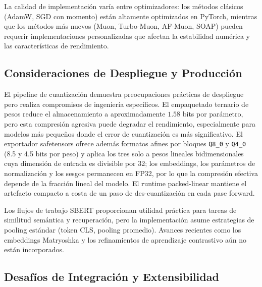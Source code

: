 La calidad de implementación varía entre optimizadores: los métodos clásicos (AdamW, SGD con momento) están altamente optimizados en PyTorch, mientras que los métodos más nuevos (Muon, Turbo-Muon, AF-Muon, SOAP) pueden requerir implementaciones personalizadas que afectan la estabilidad numérica y las características de rendimiento.

\subsection{Consideraciones de Despliegue y Producción}

El pipeline de cuantización demuestra preocupaciones prácticas de despliegue pero realiza compromisos de ingeniería específicos. El empaquetado ternario de pesos reduce el almacenamiento a aproximadamente $1.58$ bits por parámetro, pero esta compresión agresiva puede degradar el rendimiento, especialmente para modelos más pequeños donde el error de cuantización es más significativo. El exportador safetensors ofrece además formatos afines por bloques \texttt{Q8\_0} y \texttt{Q4\_0} (8.5 y 4.5 bits por peso) y aplica los tres solo a pesos lineales bidimensionales cuya dimensión de entrada es divisible por 32; los embeddings, los parámetros de normalización y los sesgos permanecen en FP32, por lo que la compresión efectiva depende de la fracción lineal del modelo. El runtime packed-linear mantiene el artefacto compacto a costa de un paso de des-cuantización en cada pase forward.

Los flujos de trabajo SBERT proporcionan utilidad práctica para tareas de similitud semántica y recuperación, pero la implementación asume estrategias de pooling estándar (token CLS, pooling promedio). Avances recientes como los embeddings Matryoshka \citep{muennighoff_matryoshka_2021} y los refinamientos de aprendizaje contrastivo \citep{chen_supervised_2020} aún no están incorporados.

\subsection{Desafíos de Integración y Extensibilidad}

